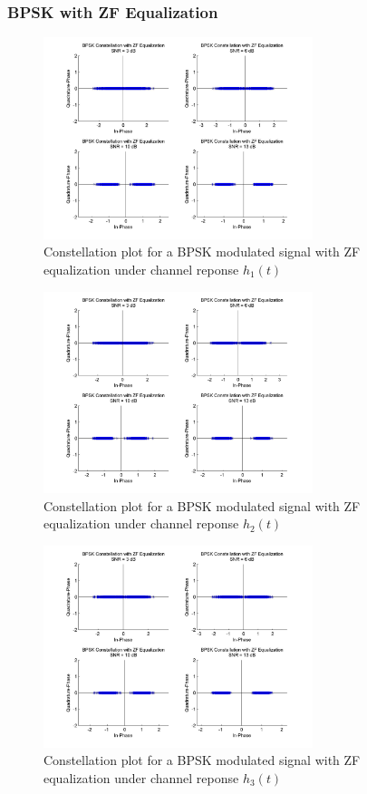 \documentclass[]{article}
\begin{document}
\subsubsection{BPSK with ZF Equalization}

\begin{figure}[H]
\centering
\includegraphics[width=0.7\textwidth]{bpConstZF1.jpg}
\caption{Constellation plot for a BPSK modulated signal with ZF equalization under channel reponse $h_1(t)$}
\end{figure}

\begin{figure}[H]
\centering
\includegraphics[width=0.7\textwidth]{bpConstZF2.jpg}
\caption{Constellation plot for a BPSK modulated signal with ZF equalization under channel reponse $h_2(t)$}
\end{figure}

\begin{figure}[H]
\centering
\includegraphics[width=0.7\textwidth]{bpConstZF3.jpg}
\caption{Constellation plot for a BPSK modulated signal with ZF equalization under channel reponse $h_3(t)$}
\end{figure}
\end{document}
